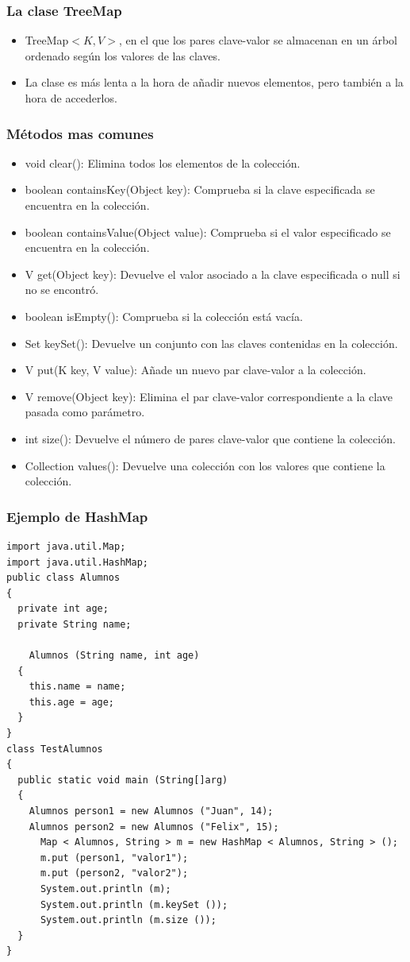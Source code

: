 \documentclass{beamer}
\begin{document}
\begin{frame}
\frametitle{La clase TreeMap}
\begin{itemize}[<+->]
\item TreeMap$<K,V>$, en el que los pares clave-valor se almacenan en un árbol ordenado según los valores de las claves.
\item La clase es más lenta a la hora de añadir nuevos elementos, pero también a la hora de accederlos.
\end{itemize}
\end{frame}

\begin{frame}
\frametitle{Métodos mas comunes}
\begin{itemize}[<+->]
\item void clear(): Elimina todos los elementos de la colección.
\item boolean containsKey(Object key): Comprueba si la clave especificada se encuentra en la colección.
\item boolean containsValue(Object value): Comprueba si el valor especificado se encuentra en la colección.
\item V get(Object key): Devuelve el valor asociado a la clave especificada o null si no se encontró.
\item boolean isEmpty(): Comprueba si la colección está vacía.
\item Set keySet(): Devuelve un conjunto con las claves contenidas en la colección.
\item V put(K key, V value): Añade un nuevo par clave-valor a la colección.
\item V remove(Object key): Elimina el par clave-valor correspondiente a la clave pasada como parámetro.
\item int size(): Devuelve el número de pares clave-valor que contiene la colección.
\item Collection values(): Devuelve una colección con los valores que contiene la colección.
\end{itemize}
\end{frame}

\begin{frame}[fragile]
\frametitle{Ejemplo de HashMap}
\begin{tiny}
\begin{verbatim}
import java.util.Map;
import java.util.HashMap;
public class Alumnos
{
  private int age;
  private String name;

    Alumnos (String name, int age)
  {
    this.name = name;
    this.age = age;
  }
}
class TestAlumnos
{
  public static void main (String[]arg)
  {
    Alumnos person1 = new Alumnos ("Juan", 14);
    Alumnos person2 = new Alumnos ("Felix", 15);
      Map < Alumnos, String > m = new HashMap < Alumnos, String > ();
      m.put (person1, "valor1");
      m.put (person2, "valor2");
      System.out.println (m);
      System.out.println (m.keySet ());
      System.out.println (m.size ());
  }
}
\end{verbatim}
\end{tiny}
\end{frame}
\end{document}
